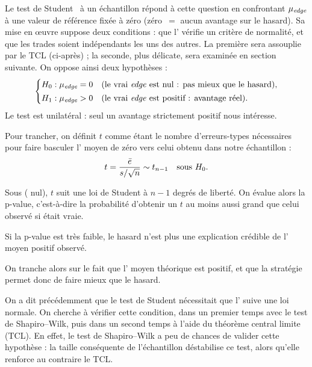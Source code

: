Le test de Student~\cite{student1908} à un échantillon répond à cette question en confrontant
\(\mu_{\textit{edge}}\) à une valeur de référence fixée à zéro (zéro~$=$ aucun
avantage sur le hasard). Sa mise en \oe uvre suppose deux conditions : que l'\edgevar{}
vérifie un critère de normalité, et que les trades soient indépendants les uns des autres.
La première sera assouplie par le TCL (ci-après) ; 
la seconde, plus délicate, sera examinée en section suivante. On oppose ainsi deux
hypothèses :
\[
  \begin{cases}
    H_0 : \mu_{\textit{edge}} = 0 & \text{(le vrai \textit{edge}{} est nul : pas mieux que le hasard),}\\[2pt]
    H_1 : \mu_{\textit{edge}} > 0 & \text{(le vrai \textit{edge}{} est positif : avantage réel).}
  \end{cases}
\]
Le test est unilatéral : seul un avantage strictement positif nous
intéresse.

Pour trancher, on définit \(t\) comme étant le nombre d'erreurs-types
nécessaires pour faire basculer l'\edgevar{} moyen de zéro vers celui obtenu
dans notre échantillon :
\[
  t = \frac{\bar e}{s/\sqrt{n}} \sim t_{n-1} \quad\text{sous } H_0 .
\]

Sous \Hzero{} (\edgevar{} nul), \(t\) suit une loi de Student à \(n-1\) degrés
de liberté. On évalue alors la p-value, c'est-à-dire la probabilité
d'obtenir un \(t\) au moins aussi grand que celui observé si \Hzero{}
était vraie.

Si la p-value est très faible, le hasard n'est plus une
explication crédible de l'\edgevar{} moyen positif observé.

On tranche alors sur le fait que l'\edgevar{} moyen théorique est positif, et que la
stratégie permet donc de faire mieux que le hasard.


On a dit précédemment que le test de Student nécessitait que l'\edgevar{} suive
une loi normale. On cherche à vérifier cette condition, dans un premier
temps avec le test de Shapiro--Wilk, puis dans un second temps à l'aide du
théorème central limite (TCL). En effet, le test de Shapiro--Wilk a peu de
chances de valider cette hypothèse : la taille conséquente de l'échantillon
déstabilise ce test, alors qu'elle renforce au contraire le TCL.

